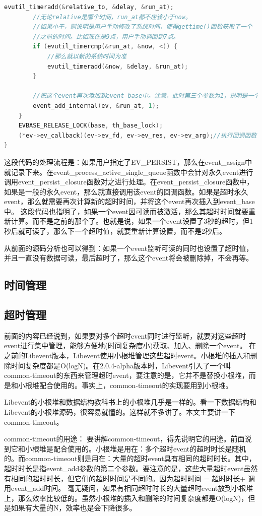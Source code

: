 \documentclass[11pt,a4paper]{article}
\begin{document}
\begin{lstlisting}[language=C]
		evutil_timeradd(&relative_to, &delay, &run_at);
		//无论relative是哪个时间，run_at都不应该小于now。
		//如果小于，则说明是用户手动修改了系统时间，使得gettime()函数获取了一个
		//之前的时间。比如现在是9点，用户手动调回到7点。
		if (evutil_timercmp(&run_at, &now, <)) {
			//那么就以新的系统时间为准
			evutil_timeradd(&now, &delay, &run_at);
		}

		//把这个event再次添加到event_base中。注意，此时第三个参数为1，说明是一个绝对时间
		event_add_internal(ev, &run_at, 1);
	}
	EVBASE_RELEASE_LOCK(base, th_base_lock);
	(*ev->ev_callback)(ev->ev_fd, ev->ev_res, ev->ev_arg);//执行回调函数
}
\end{lstlisting}
这段代码的处理流程是：如果用户指定了EV\_PERSIST，那么在event\_assign中就记录下来。在event\_process\_active\_single\_queue函数中会针对永久event进行调用event\_persist\_closure函数对之进行处理。在event\_persist\_closure函数中，如果是一般的永久event，那么就直接调用该event的回调函数。如果是超时永久event，那么就需要再次计算新的超时时间，并将这个event再次插入到event\_base中。
这段代码也指明了，如果一个event因可读而被激活，那么其超时时间就要重新计算。而不是之前的那个了。也就是说，如果一个event设置了3秒的超时，但1秒后就可读了，那么下一个超时值，就要重新计算设置，而不是2秒后。

从前面的源码分析也可以得到：如果一个event监听可读的同时也设置了超时值，并且一直没有数据可读，最后超时了，那么这个event将会被删除掉，不会再等。


\subsection{时间管理}

\subsection{超时管理}

前面的内容已经说到，如果要对多个超时event同时进行监听，就要对这些超时event进行集中管理，能够方便地(时间复杂度小)获取、加入、删除一个event。
在之前的Libevent版本，Libevent使用小根堆管理这些超时event。小根堆的插入和删除时间复杂度都是O(logN)。在2.0.4-alpha版本时，Libevent引入了一个叫common-timeout的东西来管理超时event，要注意的是，它并不是替换小根堆，而是和小根堆配合使用的。事实上，common-timeout的实现要用到小根堆。
 
Libevent的小根堆和数据结构教科书上的小根堆几乎是一样的。看一下数据结构和Libevent的小根堆源码，很容易就懂的。这样就不多讲了。本文主要讲一下common-timeout。

common-timeout的用途：
        要讲解common-timeout，得先说明它的用途。前面说到它和小根堆是配合使用的。小根堆是用在：多个超时event的超时时长是随机的。而common-timeout则是用在：大量的超时event具有相同的超时时长。其中，超时时长是指event\_add参数的第二个参数。要注意的是，这些大量超时event虽然有相同的超时时长，但它们的超时时间是不同的。因为超时时间 = 超时时长+ 调用event\_add时间。
        毫无疑问，如果有相同超时时长的大量超时event放到小根堆上，那么效率比较低的。虽然小根堆的插入和删除的时间复杂度都是O(logN)，但是如果有大量的N，效率也是会下降很多。
\end{document}
